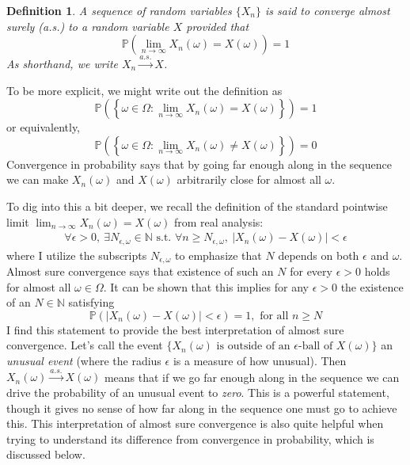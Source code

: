 \documentclass[12pt]{article}
\newcommand*{\abs}[1]{\left\lvert#1\right\rvert}
\newcommand{\Prob}{\mathbb{P}}
\newtheorem{definition}{Definition}
\begin{document}
\begin{definition}
A sequence of random variables $\{X_n\}$ is said to converge almost surely (a.s.) to a random variable $X$ provided that 
\[\mathbb{P}\left(\lim_{n \to \infty} X_n(\omega) = X(\omega)\right) = 1\]
As shorthand, we write $X_n \overset{a.s.}{\to} X$.
\end{definition}  
To be more explicit, we might write out the definition as 
\[\mathbb{P}\left(\left\{\omega \in \Omega: \lim_{n \to \infty} X_n(\omega) = X(\omega)\right\} \right) = 1\]
or equivalently, 
\[\mathbb{P}\left(\left\{\omega \in \Omega: \lim_{n \to \infty} X_n(\omega) \neq X(\omega)\right\} \right) = 0\]
Convergence in probability says that by going far enough along in the sequence we can make $X_n(\omega)$ and $X(\omega)$ arbitrarily close for almost all $\omega$.

To dig into this a bit deeper, we recall the definition of the standard pointwise limit $\lim_{n \to \infty} X_n(\omega) = X(\omega)$ from real analysis: 
\begin{align*}
\forall \epsilon > 0, \ \exists N_{\epsilon, \omega} \in \mathbb{N} \text{ s.t. } \forall n \geq N_{\epsilon, \omega}, \ \abs{X_n(\omega) - X(\omega)} < \epsilon 
\end{align*} 
where I utilize the subscripts $N_{\epsilon, \omega}$ to emphasize that $N$ depends on both $\epsilon$ and $\omega$. Almost sure convergence says that existence of such an $N$ for 
every $\epsilon > 0$ holds for almost all $\omega \in \Omega$. It can be shown that this implies for any $\epsilon > 0$ the existence of an $N \in \mathbb{N}$ satisfying 
\[\Prob(\abs{X_n(\omega) - X(\omega)} < \epsilon) = 1, \text{ for all } n \geq N\]
I find this statement to provide the best interpretation of almost sure convergence. Let's call the event $\{X_n(\omega) \text{ is outside of an } \epsilon\text{-ball of } X(\omega)\}$ an \textit{unusual event} 
(where the radius $\epsilon$ is a measure of how unusual). Then $X_n(\omega) \overset{a.s.}{\to} X(\omega)$ means that if we go far enough along in the sequence we can drive the probability of 
an unusual event to \textit{zero}. This is a powerful statement, though it gives no sense of how far along in the sequence one must go to achieve this. This interpretation of almost sure convergence is also 
quite helpful when trying to understand its difference from convergence in probability, which is discussed below. 
\end{document}
